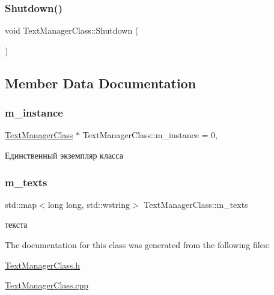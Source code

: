 \subsubsection{\texorpdfstring{Shutdown()}{Shutdown()}}
{\footnotesize\ttfamily void Text\+Manager\+Class\+::\+Shutdown (\begin{DoxyParamCaption}{ }\end{DoxyParamCaption})}



\subsection{Member Data Documentation}
\mbox{\label{class_text_manager_class_a499d0b48c5f7200edb4e07b58e63f605}} 
\subsubsection{\texorpdfstring{m\+\_\+instance}{m\_instance}}
{\footnotesize\ttfamily \hyperlink{class_text_manager_class}{Text\+Manager\+Class} $\ast$ Text\+Manager\+Class\+::m\+\_\+instance = 0\hspace{0.3cm}{\ttfamily [static]}, {\ttfamily [private]}}



Единственный экземпляр класса 

\mbox{\label{class_text_manager_class_a9f9c5d46a765b8a74d40f6983d871f51}} 
\subsubsection{\texorpdfstring{m\+\_\+texts}{m\_texts}}
{\footnotesize\ttfamily std\+::map$<$long long, std\+::wstring$>$ Text\+Manager\+Class\+::m\+\_\+texts\hspace{0.3cm}{\ttfamily [private]}}



текста 



The documentation for this class was generated from the following files\+:\begin{DoxyCompactItemize}
\item 
\hyperlink{_text_manager_class_8h}{Text\+Manager\+Class.\+h}\item 
\hyperlink{_text_manager_class_8cpp}{Text\+Manager\+Class.\+cpp}\end{DoxyCompactItemize}
